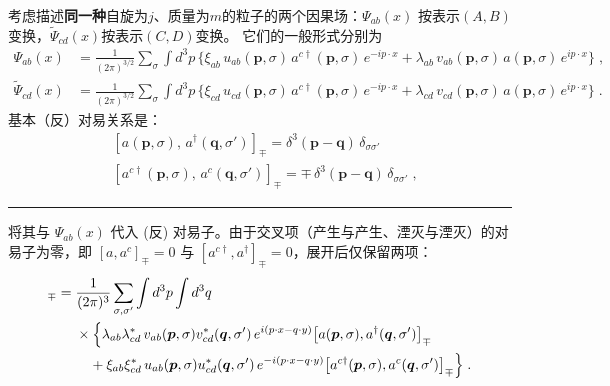 考虑描述\textbf{同一种}自旋为$j$、质量为$m$的粒子的两个因果场：$\Psi_{ab}(x)$
按表示$(A,B)$变换，$\widetilde{\Psi}_{cd}(x)$按表示$(C,D)$变换。
它们的一般形式分别为
\begin{subequations}
  \begin{align}
  \Psi_{ab}(x) &= \frac{1}{(2\pi)^{3/2}}\sum_{\sigma}\int d^{3}p\,
  \bigl\{\xi_{ab}\,u_{ab}(\boldsymbol{p},\sigma)\,a^{c\dagger}(\boldsymbol{p},\sigma)\,e^{-ip\cdot x}
  + \lambda_{ab}\,v_{ab}(\boldsymbol{p},\sigma)\,a(\boldsymbol{p},\sigma)\,e^{ip\cdot x}\bigr\}\;,
  \label{eq:field-AB}\\[4pt]
  \widetilde{\Psi}_{cd}(x) &= \frac{1}{(2\pi)^{3/2}}\sum_{\sigma}\int d^{3}p\,
  \bigl\{\xi_{cd}\,u_{cd}(\boldsymbol{p},\sigma)\,a^{c\dagger}(\boldsymbol{p},\sigma)\,e^{-ip\cdot x}
  + \lambda_{cd}\,v_{cd}(\boldsymbol{p},\sigma)\,a(\boldsymbol{p},\sigma)\,e^{ip\cdot x}\bigr\}\;.
  \label{eq:field-CD}
\end{align}
\end{subequations}
基本（反）对易关系是：
\begin{subequations}
  \begin{align}
      &[a(\boldsymbol{p},\sigma),\,a^{\dagger}(\boldsymbol{q},\sigma')]_{\mp}
      = \delta^{3}(\boldsymbol{p}-\boldsymbol{q})\,\delta_{\sigma\sigma'}\\
      &[a^{c\dagger}(\boldsymbol{p},\sigma),\,a^{c}(\boldsymbol{q},\sigma')]_{\mp}
      = \mp\,\delta^{3}(\boldsymbol{p}-\boldsymbol{q})\,\delta_{\sigma\sigma'}\;,
  \end{align}
\end{subequations}
\hrule
\vspace{2ex}
将其与 $\Psi_{ab}(x)$ 代入 (反) 对易子。由于交叉项（产生与产生、湮灭与湮灭）的对易子为零，即 $[a, a^c]_{\mp} = 0$ 与 $[a^{c\dagger}, a^\dagger]_{\mp} = 0$，展开后仅保留两项：
\begin{align*}
  [\Psi_{ab}(x),\,\widetilde{\Psi}_{cd}^{\dagger}(y)]_{\mp} 
  ={}& \frac{1}{(2\pi)^{3}} \sum_{\sigma,\sigma'} \int d^3p \int d^3q \\
  &\times \Bigl\{ \lambda_{ab}\lambda_{cd}^*\, v_{ab}(\boldsymbol{p},\sigma)v_{cd}^*(\boldsymbol{q},\sigma')\, e^{i(p\cdot x - q\cdot y)} \bigl[a(\boldsymbol{p},\sigma), a^\dagger(\boldsymbol{q},\sigma')\bigr]_{\mp} \\
  &\quad+ \xi_{ab}\xi_{cd}^*\, u_{ab}(\boldsymbol{p},\sigma)u_{cd}^*(\boldsymbol{q},\sigma')\, e^{-i(p\cdot x - q\cdot y)} \bigl[a^{c\dagger}(\boldsymbol{p},\sigma), a^c(\boldsymbol{q},\sigma')\bigr]_{\mp} \Bigr\}\;.
\end{align*}
